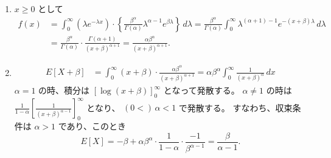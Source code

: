 \documentclass[./main.tex]{subfiles}
\begin{document}
\begin{enumerate}
\begin{minipage}[c]{0.3\textwidth}
            \end{minipage}\\

        \item  $x\geq 0$ として
        \begin{align*}
            f(x)
            &= \int_0^\infty ( \lambda e^{-\lambda x} ) \cdot 
                \left\{ \frac{\beta^\alpha}{\Gamma (\alpha)} \lambda^{\alpha - 1} e^{\beta \lambda} \right\} \, d\lambda
                = \frac{\beta^\alpha}{\Gamma (\alpha)} \int_0^\infty \lambda^{(\alpha + 1) - 1} e^{-(x + \beta) \lambda} \, d\lambda\\
            &= \frac{\beta^\alpha}{\Gamma (\alpha)} \cdot \frac{ \Gamma (\alpha + 1)}{(x + \beta)^{\alpha + 1}} 
                = \frac{\alpha \beta^\alpha}{(x + \beta)^{\alpha + 1}}.
        \end{align*}

        \item 
        \begin{align*}
            E[X + \beta]
                &= \int_0^\infty (x + \beta) \cdot \frac{\alpha \beta^\alpha}{(x + \beta)^{\alpha + 1}}
                = \alpha \beta^\alpha \int_0^\infty \frac{1}{(x + \beta)^\alpha} \, dx
        \end{align*}
        $\alpha = 1$ の時、積分は $\displaystyle \left[ \log (x + \beta) \right]_0^\infty$ となって発散する。
        $\alpha \neq 1$ の時は $\displaystyle \frac{1}{1 - \alpha} \left[ \frac{1}{(x + \beta)^{\alpha-1}}  \right]_0^\infty$ となり、
        $(0 < ) \, \alpha < 1$ で発散する。
        すなわち、収束条件は $\alpha > 1$ であり、このとき
        \begin{equation*}
            E[X] 
                = -\beta + \alpha\beta^\alpha \cdot \frac{1}{1-\alpha} \cdot \frac{-1}{\beta^{\alpha - 1}}
                = \frac{\beta}{\alpha - 1}.
        \end{equation*}



    \end{enumerate}
\end{document}
